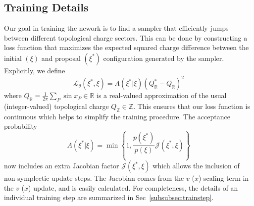 \documentclass[a4paper,11pt]{article}
\begin{document}
\subsection{\label{subsec:training}Training Details}
%
Our goal in training the nework is to find a sampler that efficiently
jumps between different topological charge sectors.
%
This can be done by constructing a loss function that maximizes the expected
squared charge difference between the initial \((\xi)\) and proposal
\((\xi^{\ast})\) configuration generated by the sampler.
%
Explicitly, we define
%
\begin{equation}
    \mathcal{L}_{\theta}(\xi^{\ast}, \xi)
    = A(\xi^{\ast}|\xi) (Q^{\ast}_{\mathbb{R}} - Q_{\mathbb{R}})^{2}
\end{equation}
%
where \(Q_{\mathbb{R}} = \frac{1}{2\pi}\sum_{P} \sin x_{P} \in \mathbb{R}\) is
a real-valued approximation of the usual (integer-valued) topological charge
\(Q_{\mathbb{Z}} \in \mathbb{Z}\).
%
This ensures that our loss function is continuous which helps to simplify the
training procedure.
%
The acceptance probability
\begin{equation}
A(\xi^{\ast} | \xi) =
\min\left\{1, \frac{p(\xi^{\ast})}{p(\xi)} \mathcal{J}(\xi^{\ast},\xi) \right\}
\end{equation}
now includes an extra Jacobian factor $\mathcal{J}(\xi^{\ast},\xi)$
which allows the inclusion of non-symplectic update steps.
The Jacobian comes from the $v$ ($x$) scaling term in the $v$ ($x$) update, and
is easily calculated.
%
For completeness, the details of an individual training step are summarized in
Sec~\ref{subsubsec:trainstep}.
%
\end{document}

